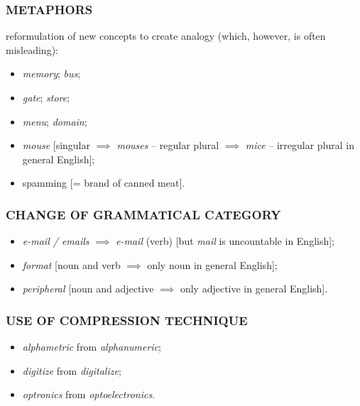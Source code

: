 \subsubsection{METAPHORS}

reformulation of new concepts to create analogy (which, however, is often misleading):

\begin{itemize}

\item \textit{memory}; \textit{bus};
\item \textit{gate}; \textit{store};
\item \textit{menu}; \textit{domain};
\item \textit{mouse} [singular $\implies$ \textit{mouses} – regular plural $\implies$ \textit{mice} – irregular plural in general English];
\item spamming [= brand of canned meat].  

\end{itemize}

\subsubsection{CHANGE OF GRAMMATICAL CATEGORY}

\begin{itemize}

\item \textit{e-mail / emails} $\implies$ \textit{e-mail} (verb) [but \textit{mail} is uncountable in English];
\item \textit{format} [noun and verb $\implies$ only noun in general English];
\item \textit{peripheral} [noun and adjective $\implies$ only adjective in general English]. 

\end{itemize}

\subsubsection{USE OF COMPRESSION TECHNIQUE}

\begin{itemize}

\item \textit{alphametric} from \textit{alphanumeric};
\item \textit{digitize} from \textit{digitalize};
\item \textit{optronics} from \textit{optoelectronics}.

\end{itemize}

